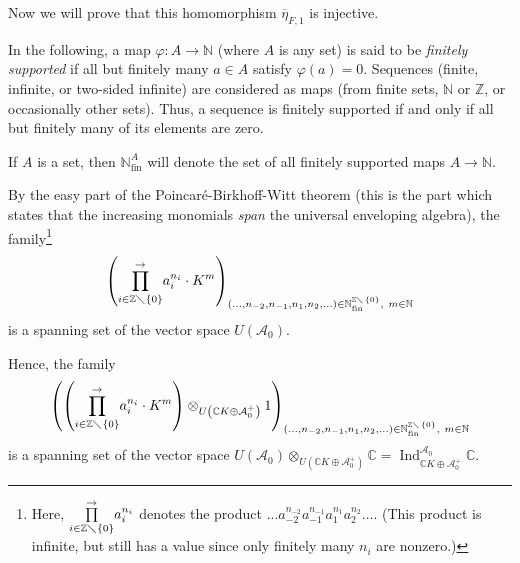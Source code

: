 \documentclass
[numbers=enddot,12pt,final,onecolumn,german,notitlepage]{scrartcl}%
\theoremstyle{definition}
\begin{document}
Now we will prove that this homomorphism $\overline{\eta}_{F,1}$ is injective.

In the following, a map $\varphi:A\rightarrow\mathbb{N}$ (where $A$ is any
set) is said to be \textit{finitely supported} if all but finitely many $a\in
A$ satisfy $\varphi\left(  a\right)  =0$. Sequences (finite, infinite, or
two-sided infinite) are considered as maps (from finite sets, $\mathbb{N}$ or
$\mathbb{Z}$, or occasionally other sets). Thus, a sequence is finitely
supported if and only if all but finitely many of its elements are zero.

If $A$ is a set, then $\mathbb{N}_{\operatorname*{fin}}^{A}$ will denote the
set of all finitely supported maps $A\rightarrow\mathbb{N}$.

By the easy part of the Poincar\'{e}-Birkhoff-Witt theorem (this is the part
which states that the increasing monomials \textit{span} the universal
enveloping algebra), the family\footnote{Here, $\overset{\rightarrow
}{\prod\limits_{i\in\mathbb{Z}\diagdown\left\{  0\right\}  }}a_{i}^{n_{i}}$
denotes the product $...a_{-2}^{n_{-2}}a_{-1}^{n_{-1}}a_{1}^{n_{1}}%
a_{2}^{n_{2}}...$. (This product is infinite, but still has a value since only
finitely many $n_{i}$ are nonzero.)}%
\[
\left(  \overset{\rightarrow}{\prod\limits_{i\in\mathbb{Z}\diagdown\left\{
0\right\}  }}a_{i}^{n_{i}}\cdot K^{m}\right)  _{\left(  ...,n_{-2}%
,n_{-1},n_{1},n_{2},...\right)  \in\mathbb{N}_{\operatorname*{fin}%
}^{\mathbb{Z}\diagdown\left\{  0\right\}  },\ m\in\mathbb{N}}%
\]
is a spanning set of the vector space $U\left(  \mathcal{A}_{0}\right)  $.

Hence, the family%
\[
\left(  \left(  \overset{\rightarrow}{\prod\limits_{i\in\mathbb{Z}%
\diagdown\left\{  0\right\}  }}a_{i}^{n_{i}}\cdot K^{m}\right)  \otimes
_{U\left(  \mathbb{C}K\oplus\mathcal{A}_{0}^{+}\right)  }1\right)  _{\left(
...,n_{-2},n_{-1},n_{1},n_{2},...\right)  \in\mathbb{N}_{\operatorname*{fin}%
}^{\mathbb{Z}\diagdown\left\{  0\right\}  },\ m\in\mathbb{N}}%
\]
is a spanning set of the vector space $U\left(  \mathcal{A}_{0}\right)
\otimes_{U\left(  \mathbb{C}K\oplus\mathcal{A}_{0}^{+}\right)  }%
\mathbb{C}=\operatorname*{Ind}\nolimits_{\mathbb{C}K\oplus\mathcal{A}_{0}^{+}%
}^{\mathcal{A}_{0}}\mathbb{C}$.
\end{document}
